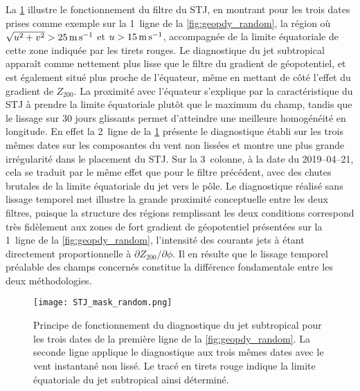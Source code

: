 \documentclass[../main.tex]{subfiles}
\begin{document}
La \cref{fig:STJ_random} illustre le fonctionnement du filtre du STJ, en montrant pour les trois dates prises comme exemple sur la 1\iere~ligne de la
\cref{fig:geopdy_random}, la région où $\sqrt{u^2 + v^2} > \SI{25}{\metre\per\second}$ et $u > \SI{15}{\metre\per\second}$, accompagnée de la limite équatoriale de cette zone indiquée par les tirets
rouges. Le diagnostique du jet subtropical apparaît comme nettement plus lisse que le filtre du gradient de géopotentiel, et est également situé plus proche de
l'équateur, même en mettant de côté l'effet  du gradient de $Z_{200}$. La proximité avec l'équateur s'explique par la caractéristique du STJ à
prendre la limite équatoriale plutôt que le maximum du champ, tandis que le lissage sur 30 jours glissants permet d'atteindre une meilleure homogénéité en
longitude. En effet la 2\ieme~ligne de la \cref{fig:STJ_random} présente le diagnostique établi sur les trois mêmes dates sur les composantes du vent non
lissées et montre une plus grande irrégularité dans le placement du STJ. Sur la 3\ieme~colonne, à la date du 2019--04--21, cela se traduit par le même effet que
pour le filtre précédent, avec des chutes brutales de la limite équatoriale du jet vers le pôle. Le diagnostique réalisé sans lissage temporel met illustre la
grande proximité conceptuelle entre les deux filtres, puisque la structure des régions remplissant les deux conditions correspond très fidèlement aux zones de
fort gradient de géopotentiel présentées sur la 1\iere~ligne de la \cref{fig:geopdy_random}, l'intensité des courants jets à  étant directement
proportionnelle à $\partial Z_{200} / \partial \phi$. Il en résulte que le lissage temporel préalable des champs concernés constitue la différence fondamentale
entre les deux méthodologies.

\begin{figure}[tb]
    \centering
    \texttt{[image: STJ\_mask\_random.png]}
    \caption{Principe de fonctionnement du diagnostique du jet subtropical pour les trois dates de la première ligne de la \cref{fig:geopdy_random}. La seconde
    ligne applique le diagnostique aux trois mêmes dates avec le vent instantané non lissé. Le tracé en tirets rouge indique la limite équatoriale du jet
    subtropical ainsi déterminé.}
    \label{fig:STJ_random}
\end{figure}
\end{document}
